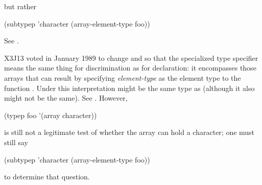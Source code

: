 \begin{flushdesc}
but rather
\begin{lisp}
(subtypep 'character (array-element-type foo))
\end{lisp}
See .
\begin{new}
X3J13 voted in January 1989
to change  and 
so that the specialized  type specifier
means the same thing for discrimination
as for declaration: it encompasses those arrays
that can result by specifying {\it element-type} as the element type
to the function .
Under this interpretation  might be
the same type as 
(although it also might not be the same).
See .
However,
\begin{lisp}
(typep foo '(array character))
\end{lisp}
is still not a legitimate test of whether the array
 can hold a character; one must still say
\begin{lisp}
(subtypep 'character (array-element-type foo))
\end{lisp}
to determine that question.


\end{new}
\end{flushdesc}
